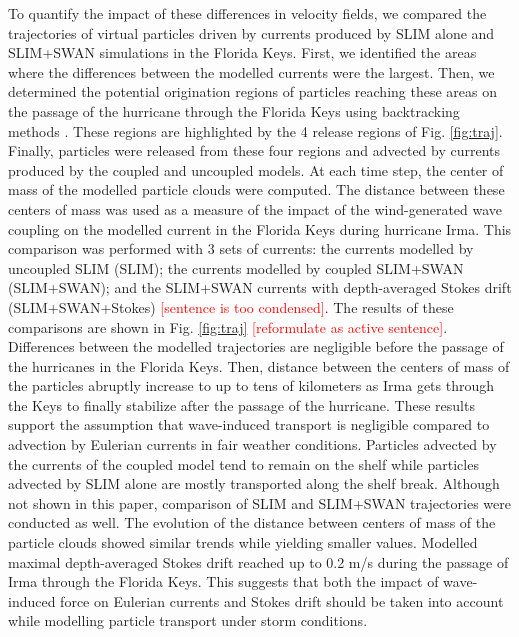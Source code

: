 \documentclass[11pt,a4paper]{article}
\begin{document}
To quantify the impact of these differences in velocity fields, we compared the trajectories of virtual particles driven by currents produced by SLIM alone and SLIM+SWAN simulations in the Florida Keys. First, we identified the areas where the differences between the modelled currents were the largest. Then, we determined the potential origination regions of particles reaching these areas on the passage of the hurricane through the Florida Keys using backtracking methods \citep{dobbelaerereport}. These regions are highlighted by the 4 release regions of Fig. \ref{fig:traj}. Finally, particles were released from these four regions and advected by currents produced by the coupled and uncoupled models. At each time step, the center of mass of the modelled particle clouds were computed. The distance between these centers of mass was used as a measure of the impact of the wind-generated wave coupling on the modelled current in the Florida Keys during hurricane Irma. This comparison was performed with 3 sets of currents: the currents modelled by uncoupled SLIM (SLIM); the currents modelled by coupled SLIM+SWAN (SLIM+SWAN); and the SLIM+SWAN currents with depth-averaged Stokes drift (SLIM+SWAN+Stokes) \textcolor{red}{[sentence is too condensed]}. The results of these comparisons are shown in Fig. \ref{fig:traj} \textcolor{red}{[reformulate as active sentence]}. Differences between the modelled trajectories are negligible before the passage of the hurricanes in the Florida Keys. Then, distance between the centers of mass of the particles abruptly increase to up to tens of kilometers as Irma gets through the Keys to finally stabilize after the passage of the hurricane. These results support the assumption that wave-induced transport is negligible compared to advection by Eulerian currents in fair weather conditions. Particles advected by the currents of the coupled model tend to remain on the shelf while particles advected by SLIM alone are mostly transported along the shelf break. Although not shown in this paper, comparison of SLIM and SLIM+SWAN trajectories were conducted as well. The evolution of the distance between centers of mass of the particle clouds showed similar trends while yielding smaller values. Modelled maximal depth-averaged Stokes drift reached up to 0.2 m/s during the passage of Irma through the Florida Keys. This suggests that both the impact of wave-induced force on Eulerian currents and Stokes drift should be taken into account while modelling particle transport under storm conditions. 
\end{document}
